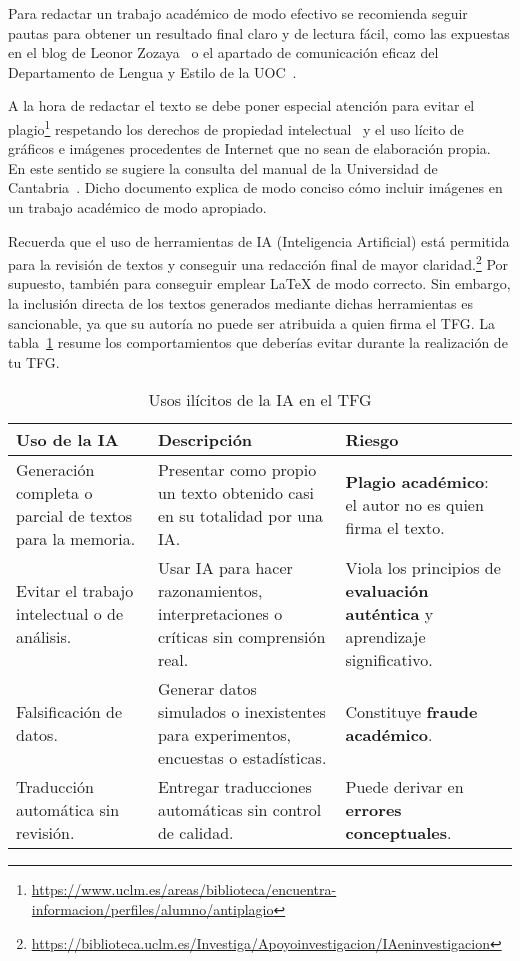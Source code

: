 Para redactar un trabajo académico de modo efectivo se recomienda seguir pautas para obtener un resultado final claro y de lectura fácil, como las expuestas en el blog de Leonor Zozaya~\cite{zozaya17} o el apartado de comunicación eficaz del Departamento de Lengua y Estilo de la UOC~\cite{uoc}.

A la hora de redactar el texto se debe poner especial atención para evitar el plagio\footnote{\url{https://www.uclm.es/areas/biblioteca/encuentra-informacion/perfiles/alumno/antiplagio}} respetando los derechos de propiedad intelectual~\cite{uc3m21} y el uso lícito de gráficos e imágenes procedentes de Internet que no sean de elaboración propia. En este sentido se sugiere la consulta del manual de la Universidad de Cantabria~\cite{unican18}. Dicho documento explica de modo conciso cómo incluir imágenes en un trabajo académico de modo apropiado.

Recuerda que el uso de herramientas de IA (Inteligencia Artificial) está permitida para la revisión de textos y conseguir una redacción final de mayor claridad.\footnote{\url{https://biblioteca.uclm.es/Investiga/Apoyoinvestigacion/IAeninvestigacion}} Por supuesto, también para conseguir emplear \LaTeX{} de modo correcto. Sin embargo, la inclusión directa de los textos generados mediante dichas herramientas es sancionable, ya que su autoría no puede ser atribuida a quien firma el TFG. La tabla~\ref{tab:ia} resume los comportamientos que deberías evitar durante la realización de tu TFG.

\begin{table}[H]%
	\centering
	\caption{Usos ilícitos de la IA en el TFG}
	\label{tab:ia}
	\begin{tabular}{ | p{4cm} | p{4cm} | p{4cm} |}
		\hline
		\textbf{Uso de la IA} & \textbf{Descripción} & \textbf{Riesgo} \\
		\hline
		Generación completa o parcial de textos para la memoria.&
		Presentar como propio un texto obtenido casi en su totalidad por una IA. &
		\textbf{Plagio académico}: el autor no es quien firma el texto.\\
		\hline
		Evitar el trabajo intelectual o de análisis. &
		Usar IA para hacer razonamientos, interpretaciones o críticas sin comprensión real. &
		Viola los principios de \textbf{evaluación auténtica} y aprendizaje significativo. \\
		\hline
		Falsificación de datos. & Generar datos simulados o inexistentes para experimentos, encuestas o estadísticas. &
		Constituye \textbf{fraude académico}.\\
		\hline
		Traducción automática sin revisión. &
		Entregar traducciones automáticas sin control de calidad. &
		Puede derivar en \textbf{errores conceptuales}.\\
		\hline
	\end{tabular}
\end{table}


